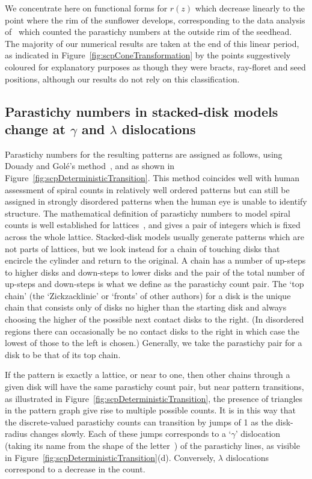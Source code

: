 \documentclass[a4paper,10pt]{amsart}
\begin{document}
We concentrate here on functional forms for $r(z)$ which decrease linearly to the point where the rim of the sunflower develops, corresponding to the data analysis of~\cite{swintonNovelFibonacciNonFibonacci2016} which counted the parastichy numbers at the outside rim of the seedhead. The majority of our numerical results are taken at the end of this linear  period, as indicated in Figure~\ref{fig:scpConeTransformation} by the points suggestively coloured for explanatory purposes as though they were bracts, ray-floret and seed positions, although our results do not rely on this classification. 



\subsection{Parastichy numbers in stacked-disk models change at $\gamma$ and $\lambda$ dislocations}
\label{sec:gammalambda}
 Parastichy numbers for the resulting patterns are assigned as follows, using Douady and Gol\'e's method~\cite{goleFibonacciQuasisymmetricPhyllotaxis2016}, and as shown in Figure~\ref{fig:scpDeterministicTransition}. This method coincides well with human assessment of spiral counts in relatively well ordered patterns but can still be assigned in strongly disordered patterns when the human eye is unable to identify structure. 
%
The mathematical definition of parastichy numbers to model spiral counts is well established for lattices~\cite{swintonMathematicalPhyllotaxis2023}, and gives a pair of integers which is fixed across the whole lattice. Stacked-disk models usually generate patterns which are not parts of lattices, but we look instead for a chain of touching disks that encircle the cylinder and return to the original.   A chain has a number of up-steps to higher disks and down-steps to lower disks and the pair of the total number of up-steps and down-steps is what we define as the parastichy count pair. The `top chain' (the  `Zickzacklinie' or `fronts' of other authors) for a disk is the unique chain that consists only of disks no higher than the starting disk and always choosing the higher of the possible next contact disks to the right. (In disordered regions there can occasionally be no contact disks to the right in which case the lowest of those to the left is chosen.)  Generally, we take the parastichy pair for a disk to be that of its top chain. 

If the pattern is exactly a lattice, or near to one,
then other chains  through a given disk will have the same parastichy count pair, but near pattern transitions, as illustrated in Figure~\ref{fig:scpDeterministicTransition}, the presence of triangles in the pattern graph give rise to  multiple possible  counts. It is in this way that the discrete-valued parastichy counts can transition by jumps of 1 as the disk-radius changes slowly. 
Each of these jumps corresponds to a `$\gamma$' dislocation (taking its name from the shape of the letter~\cite{zagorska-marekPhyllotacticPatternsTransitions1985}) of the parastichy lines,  as visible in Figure~\ref{fig:scpDeterministicTransition}(d). 
Conversely, $\lambda$ dislocations correspond to a decrease in the count.
\end{document}
